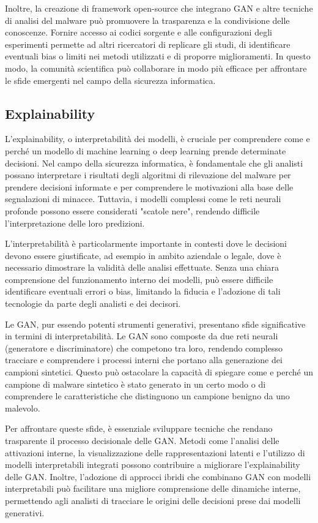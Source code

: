 Inoltre, la creazione di framework open-source che integrano GAN e altre tecniche di analisi del malware può promuovere la trasparenza e la condivisione delle conoscenze. Fornire accesso ai codici sorgente e alle configurazioni degli esperimenti permette ad altri ricercatori di replicare gli studi, di identificare eventuali bias o limiti nei metodi utilizzati e di proporre miglioramenti. In questo modo, la comunità scientifica può collaborare in modo più efficace per affrontare le sfide emergenti nel campo della sicurezza informatica.

\subsection{Explainability}

L'explainability, o interpretabilità dei modelli, è cruciale per comprendere come e perché un modello di machine learning o deep learning prende determinate decisioni. Nel campo della sicurezza informatica, è fondamentale che gli analisti possano interpretare i risultati degli algoritmi di rilevazione del malware per prendere decisioni informate e per comprendere le motivazioni alla base delle segnalazioni di minacce. Tuttavia, i modelli complessi come le reti neurali profonde possono essere considerati "scatole nere", rendendo difficile l'interpretazione delle loro predizioni.

L'interpretabilità è particolarmente importante in contesti dove le decisioni devono essere giustificate, ad esempio in ambito aziendale o legale, dove è necessario dimostrare la validità delle analisi effettuate. Senza una chiara comprensione del funzionamento interno dei modelli, può essere difficile identificare eventuali errori o bias, limitando la fiducia e l'adozione di tali tecnologie da parte degli analisti e dei decisori.

Le GAN, pur essendo potenti strumenti generativi, presentano sfide significative in termini di interpretabilità. Le GAN sono composte da due reti neurali (generatore e discriminatore) che competono tra loro, rendendo complesso tracciare e comprendere i processi interni che portano alla generazione dei campioni sintetici. Questo può ostacolare la capacità di spiegare come e perché un campione di malware sintetico è stato generato in un certo modo o di comprendere le caratteristiche che distinguono un campione benigno da uno malevolo.

Per affrontare queste sfide, è essenziale sviluppare tecniche che rendano trasparente il processo decisionale delle GAN. Metodi come l'analisi delle attivazioni interne, la visualizzazione delle rappresentazioni latenti e l'utilizzo di modelli interpretabili integrati possono contribuire a migliorare l'explainability delle GAN. Inoltre, l'adozione di approcci ibridi che combinano GAN con modelli interpretabili può facilitare una migliore comprensione delle dinamiche interne, permettendo agli analisti di tracciare le origini delle decisioni prese dai modelli generativi.

